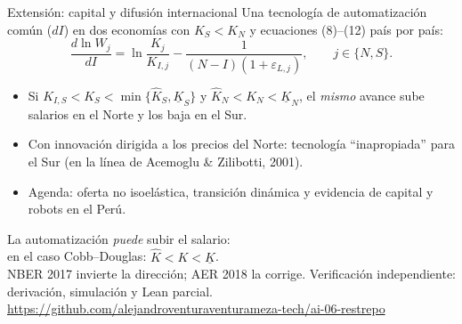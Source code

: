 \documentclass[aspectratio=169,10pt]{beamer}
\newcommand{\repourl}{https://github.com/alejandroventuraventurameza-tech/ai-06-restrepo}
\newcommand{\Kl}{\underline K}
\newcommand{\Kh}{\hat K}
\newcommand{\eps}{\varepsilon}
\begin{document}
\begin{frame}{Extensión: capital y difusión internacional}
Una tecnología de automatización común ($dI$) en dos economías con $K_S<K_N$ y ecuaciones (8)–(12) país por país:
\[
\frac{d\ln W_j}{dI}=\ln\frac{K_j}{K_{I,j}}-\frac{1}{(N-I)(1+\eps_{L,j})},\qquad j\in\{N,S\}.
\]
\begin{itemize}
  \item Si $K_{I,S}<K_S<\min\{\Kh_S,\Kl_S\}$ y $\Kh_N<K_N<\Kl_N$, el \emph{mismo} avance sube salarios en el Norte y los baja en el Sur.
  \item Con innovación dirigida a los precios del Norte: tecnología ``inapropiada'' para el Sur (en la línea de Acemoglu \& Zilibotti, 2001).
  \item Agenda: oferta no isoelástica, transición dinámica y evidencia de capital y robots en el Perú.
\end{itemize}
\end{frame}

\begin{frame}[standout]
La automatización \emph{puede} subir el salario:\\ en el caso Cobb--Douglas: $\Kh<K<\Kl$.\\[6pt]
\normalsize NBER 2017 invierte la dirección; AER 2018 la corrige. Verificación independiente: derivación, simulación y Lean parcial.\\[8pt]
\small\url{\repourl}
\end{frame}
\end{document}
